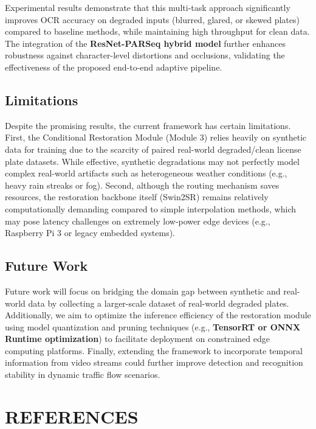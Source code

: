 \documentclass[a4paper,11pt,twocolumn]{article}
\begin{document}
	Experimental results demonstrate that this multi-task approach significantly improves OCR accuracy on degraded inputs (blurred, glared, or skewed plates) compared to baseline methods, while maintaining high throughput for clean data. The integration of the \textbf{ResNet-PARSeq hybrid model} further enhances robustness against character-level distortions and occlusions, validating the effectiveness of the proposed end-to-end adaptive pipeline.
	
	\subsection{Limitations}
	Despite the promising results, the current framework has certain limitations. First, the Conditional Restoration Module (Module 3) relies heavily on synthetic data for training due to the scarcity of paired real-world degraded/clean license plate datasets. While effective, synthetic degradations may not perfectly model complex real-world artifacts such as heterogeneous weather conditions (e.g., heavy rain streaks or fog). Second, although the routing mechanism saves resources, the restoration backbone itself (Swin2SR) remains relatively computationally demanding compared to simple interpolation methods, which may pose latency challenges on extremely low-power edge devices (e.g., Raspberry Pi 3 or legacy embedded systems).
	
	\subsection{Future Work}
	Future work will focus on bridging the domain gap between synthetic and real-world data by collecting a larger-scale dataset of real-world degraded plates. Additionally, we aim to optimize the inference efficiency of the restoration module using model quantization and pruning techniques (e.g., \textbf{TensorRT or ONNX Runtime optimization}) to facilitate deployment on constrained edge computing platforms. Finally, extending the framework to incorporate temporal information from video streams could further improve detection and recognition stability in dynamic traffic flow scenarios.
	
	\section{REFERENCES}	
	\begingroup
	\renewcommand{\section}[2]{}  
	
	
	\endgroup
\end{document}
